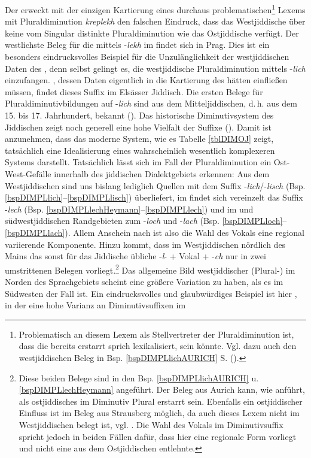 Der  erweckt mit der einzigen Kartierung eines durchaus problematischen\footnote{Problematisch an diesem Lexem als Stellvertreter der Pluraldiminution ist, dass die  bereits erstarrt sprich lexikalisiert, sein könnte. Vgl. dazu auch den westjiddischen Beleg in Bsp. \ref{bspDIMPLlichAURICH} S. \pageref{bspDIMPLlichAURICH} (\cite[133]{Reershemius2007}).} Lexems mit Pluraldiminution  \textit{kreplekh}  den falschen Eindruck, dass das Westjiddische über keine vom Singular distinkte Pluraldiminution wie das Ostjiddische verfügt. Der westlichste Beleg für die  mittels -\textit{lekh} im  findet sich in Prag. Dies ist ein besonders eindrucksvolles Beispiel für die Unzulänglichkeit der westjiddischen Daten des , denn selbst \textcite[94, Karte Nr. 34]{GuggenheimGruenberg1973} gelingt es, die westjiddische Pluraldiminution mittels -\textit{lich} einzufangen. \textcite[56]{Zuckerman1969}, dessen Daten eigentlich in die Kartierung des  hätten einfließen müssen, findet dieses Suffix im Elsässer Jiddisch. Die ersten Belege für Pluraldiminutivbildungen auf -\textit{lich} sind aus dem Mitteljiddischen, d.\,h. aus dem 15. bis 17. Jahrhundert, bekannt (\cite[112]{Timm2005}). Das historische Diminutivsystem des Jiddischen zeigt noch generell eine hohe Vielfalt der Suffixe (\cite[109–113]{Timm2005}). Damit ist anzunehmen, dass das moderne System, wie es Tabelle \ref{tblDIMOJ} zeigt, tatsächlich eine Idealisierung eines wahrscheinlich wesentlich komplexeren Systems darstellt. Tatsächlich lässt sich im Fall der Pluraldiminution ein Ost-West-Gefälle innerhalb des jiddischen Dialektgebiets erkennen: Aus dem Westjiddischen sind uns bislang lediglich Quellen mit dem Suffix -\textit{lich}/-\textit{lisch} (Bsp. \ref{bspDIMPLlich}–\ref{bspDIMPLlisch}) überliefert, im  findet sich vereinzelt das Suffix -\textit{lech} (Bsp. \ref{bspDIMPLlechHeymann}–\ref{bspDIMPLlech}) und im  und südwestjiddischen Randgebieten zum  -\textit{loch} und -\textit{lach} (Bsp. \ref{bspDIMPLloch}–\ref{bspDIMPLlach}). Allem Anschein nach ist also die Wahl des Vokals eine regional variierende Komponente. Hinzu kommt, dass im Westjiddischen nördlich des Mains das sonst für das Jiddische übliche  -\textit{l}- +  Vokal + -\textit{ch} nur in zwei umstrittenen Belegen vorliegt.\footnote{Diese beiden Belege sind in den Bsp. \ref{bspDIMPLlichAURICH} u. \ref{bspDIMPLlechHeymann} angeführt. Der Beleg aus Aurich kann, wie \textcite[133 Fn. 199]{Reershemius2007} anführt, als ostjiddisches  im Diminutiv Plural erstarrt sein. Ebenfalls ein ostjiddischer Einfluss ist im Beleg aus Strausberg möglich, da auch dieses Lexem nicht im Westjiddischen belegt ist, vgl. \textcite[40f]{Schaefer2010}. Die Wahl des Vokals im Diminutivsuffix spricht jedoch in beiden Fällen dafür, dass hier eine regionale Form vorliegt und nicht eine aus dem Ostjiddischen entlehnte.} Das allgemeine Bild westjiddischer (Plural-) im Norden des Sprachgebiets scheint eine größere Variation zu haben, als es im Südwesten der Fall ist. Ein eindrucksvolles und glaubwürdiges Beispiel ist hier , in der eine hohe Varianz an Diminutivsuffixen im 